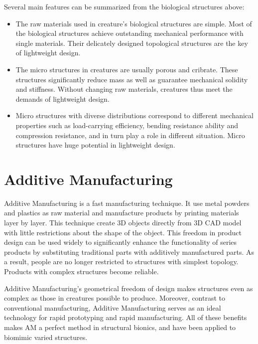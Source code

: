 Several main features can be summarized from the biological structures above:\\
\begin{itemize}
\item The raw materials used in creature's biological structures are simple. Most of the biological structures achieve outstanding mechanical performance with single materials. Their delicately designed topological structures are the key of lightweight design.

\item The micro structures in creatures are usually porous and cribrate. These structures significantly reduce mass as well as guarantee mechanical solidity and stiffness. Without changing raw materials, creatures thus meet the demands of lightweight design.

\item Micro structures with diverse distributions correspond to different mechanical properties such as load-carrying efficiency, bending resistance ability and compression resistance, and in turn play a role in different situation. Micro structures have huge potential in lightweight design.
\end{itemize}

\section{Additive Manufacturing}

Additive Manufacturing is a fast manufacturing technique. It use metal powders and plastics as raw material and manufacture products by printing materials layer by layer. This technique create 3D objects directly from 3D CAD model with little restrictions about the shape of the object. This freedom in product design can be used widely to significantly enhance the functionality of series products by substituting traditional parts with additively manufactured parts. As a result, people are no longer restricted to structures with simplest topology. Products with complex structures become reliable. 

Additive Manufacturing’s geometrical freedom of design makes structures even as complex as those in creatures possible to produce. Moreover, contrast to conventional manufacturing, Additive Manufacturing serves as an ideal technology for rapid prototyping and rapid manufacturing. All of these benefits makes AM a perfect method in structural bionics, and have been applied to biomimic varied structures.


